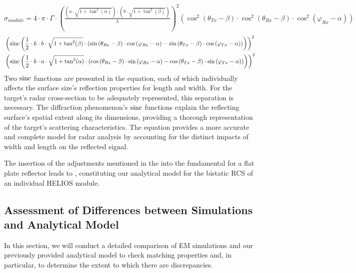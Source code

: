$	\sigma_{module}= 4 \cdot \pi \cdot \Gamma \cdot \left( \frac{\left( a \cdot \sqrt{1+\tan^2(\alpha)}\right) \cdot \left( b \cdot \sqrt{1+\tan^2(\beta)} \right) }{\lambda} \right) ^2 \left( \cos^2 \left( \theta_{Tx}-\beta \right) \cdot \cos^2 \left( \theta_{Rx}-\beta \right) \cdot \cos^2 \left( \varphi_{Rx}-\alpha \right) \right)$
\begin{equation} \label{Eq:HELIOS_module}
	\begin{aligned}
		& \left( \operatorname{sinc} \left( \frac{1}{2} \cdot k \cdot b \cdot \sqrt{1+\tan^2(\beta)} \cdot \left( \sin \left( \theta_{Rx}-\beta \right) \cdot \cos \left( \varphi_{Rx}-\alpha \right) -\sin \left( \theta_{Tx}-\beta \right) \cdot \cos \left( \varphi_{Tx}-\alpha \right) \right) \right) \right)^2\\
		&  \left( \operatorname{sinc} \left( \frac{1}{2} \cdot k \cdot a \cdot \sqrt{1+\tan^2(\alpha)} \cdot \left( \cos \left( \theta_{Rx}-\beta \right) \cdot \sin \left( \varphi_{Rx}-\alpha \right) -\cos \left( \theta_{Tx}-\beta \right) \cdot \sin \left( \varphi_{Tx}-\alpha \right) \right) \right) \right)^2 
	\end{aligned}
\end{equation}
Two $\operatorname{sinc}$ functions are presented in the equation, each of which individually affects the surface size's reflection properties for length and width. For the target's radar cross-section to be adequately represented, this separation is necessary. The diffraction phenomenon's $\operatorname{sinc}$ functions explain the reflecting surface's spatial extent along its dimensions, providing a thorough representation of the target's scattering characteristics. The equation provides a more accurate and complete model for radar analysis by accounting for the distinct impacts of width and length on the reflected signal.

The insertion of the adjustments mentioned in the  into the fundamental  for a flat plate reflector leads to , constituting our analytical model for the bistatic RCS of an individual HELIOS module.
\subsection{Assessment of Differences between Simulations and Analytical Model} \label{Assessment of Differences between Simulations and Analytical Model}
In this section, we will conduct a detailed comparison of EM simulations and our previously provided analytical model to check matching properties and, in particular, to determine the extent to which there are discrepancies.

